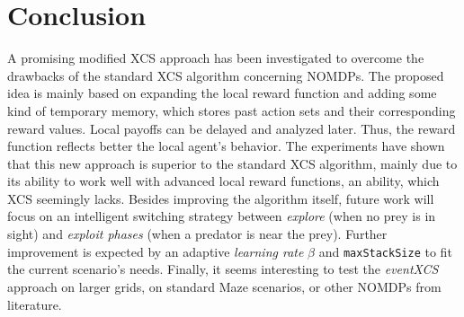 \documentclass{sig-alternate}
\begin{document}
%

\section{Conclusion}
\label{section:conclusion}

A promising modified XCS approach has been investigated to overcome the drawbacks of the standard XCS algorithm concerning NOMDPs. The proposed idea is mainly based on expanding the local reward function and adding some kind of temporary memory, which stores past action sets and their corresponding reward values. Local payoffs can be delayed and analyzed later. Thus, the reward function reflects better the local agent's behavior. The experiments have shown that this new approach is superior to the standard XCS algorithm, mainly due to its ability to work well with advanced local reward functions, an ability, which XCS seemingly lacks. Besides improving the algorithm itself, future work will focus on an intelligent switching strategy between \emph{explore} (when no prey is in sight) and \emph{exploit phases} (when a predator is near the prey). Further improvement is expected by an adaptive \emph{learning rate} $\beta$ and %
\verb|maxStackSize| to fit the current scenario's needs. Finally, it seems interesting to test the \emph{eventXCS} approach on larger grids, on standard Maze scenarios, or other NOMDPs from literature.
\end{document}
